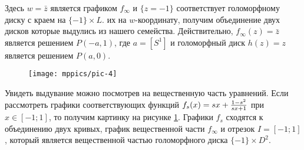 Здесь $w = \bar z$ является графиком $f_\infty$ и $\{z = -1\}$ соответствует голоморфному диску с краем на $\{-1\} \times L$.
 их на $w$-координату, получим объединение двух дисков которые выдулись из нашего семейства.
Действительно, $f_\infty (z) = \bar z$ является решением $P (-a, 1)$, где $a = [S^1]$ и голоморфный диск $h (z) = z$ является решением $P (a, 0)$.

\begin{figure}[ht!]
\vskip-0mm
\centering
\texttt{[image: mppics/pic-4]}
\caption{}\label{pic-4}
\vskip0mm
\end{figure}

Увидеть выдувание можно посмотрев на вещественную часть уравнений.
Если рассмотреть графики соответствующих функций
$f_s(x)\z=sx+\frac{1-s^2}{sx+1}$ при $x \in [-1;1]$, 
то получим картинку на рисунке \ref{pic-4}. 
Графики $f_s$ сходятся к объединению двух кривых, график вещественной
части $f_\infty$ и отрезок $I = [-1;1]$, который является
вещественной частью голоморфного диска $\{-1\} \times D^2$.  
